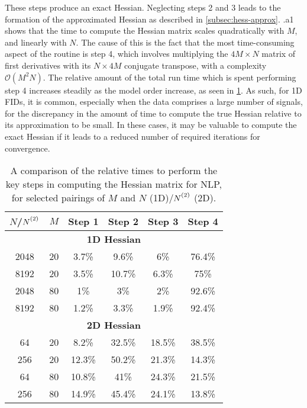 These steps produce an exact Hessian. Neglecting steps 2 and 3 leads to the
formation of the approximated Hessian as described in
\cref{subsec:hess-approx}. .a1 shows that the
time to compute the Hessian matrix scales quadratically with $M$, and
linearly with $N$. The cause of this is the fact that the most time-consuming
aspect of the routine is step 4, which involves multiplying the $4M \times N$
matrix of first derivatives with its  $N \times 4M$ conjugate transpose, with a
complexity $\mathcal{O}(M^2N)$. The relative amount of the total run time which
is spent performing step 4 increases steadily as the model order increase, as
seen in \cref{tab:hess-steps}.
As such, for \ac{1D} \acp{FID}, it is
common, especially when the data comprises a large number of
signals, for the discrepancy in the amount of time to compute the true
Hessian relative to its approximation to be small. In these cases, it may be
valuable to compute the exact Hessian if it leads to a reduced number of
required iterations for convergence.
\begin{table}
    \begin{center}
        \begin{tabular}{ c c c c c c }
            \toprule
            $N$/$\Ntwo$ &
            $M$ &
            Step 1 &
            Step 2 &
            Step 3 &
            Step 4 \\
            \midrule
            \multicolumn{6}{c}{\textbf{1D Hessian}}\\
            \midrule
            2048 & 20 & 3.7\% & 9.6\% & 6\% & 76.4\% \\
            8192 & 20 & 3.5\% & 10.7\% & 6.3\% & 75\% \\
            2048 & 80 & 1\% & 3\% & 2\% & 92.6\% \\
            8192 & 80 & 1.2\% & 3.3\% & 1.9\% & 92.4\% \\
            \midrule
            \multicolumn{6}{c}{\textbf{2D Hessian}}\\
            \midrule
            64 & 20 & 8.2\% & 32.5\% & 18.5\% & 38.5\% \\
            256 & 20 & 12.3\% & 50.2\% & 21.3\% & 14.3\% \\
            64 & 80 & 10.8\% & 41\% & 24.3\% & 21.5\% \\
            256 & 80 & 14.9\% & 45.4\% & 24.1\% & 13.8\% \\
            \bottomrule
        \end{tabular}
    \end{center}
    \caption[
        A comparison of the relative times to perform the key steps in
        computing the Hessian matrix for \acs{NLP}.
    ]{
        A comparison of the relative times to perform the key steps in
        computing the Hessian matrix for \acs{NLP}, for selected pairings of
        $M$ and $N$ (\ac{1D})/$\Ntwo$ (\ac{2D}).
    }
    \label{tab:hess-steps}
\end{table}

